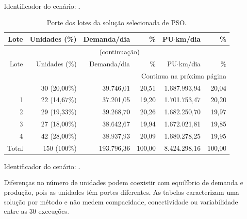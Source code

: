 Identificador do cenário: {\footnotesize{}}.

\begingroup\small
\setlength{\tabcolsep}{5pt}
\begin{longtable}{rrrrrr}
\caption{Porte dos lotes da solução selecionada de PSO.}\label{tab:lotes-pso}\\
\toprule
Lote & Unidades (\%) & Demanda/dia & \% & PU$\cdot$km/dia & \% \\
\midrule
\endfirsthead
\multicolumn{6}{c}{\tablename~\thetable{} (continuação)}\\
\toprule
Lote & Unidades (\%) & Demanda/dia & \% & PU$\cdot$km/dia & \% \\
\midrule
\endhead
\midrule\multicolumn{6}{r}{Continua na próxima página}\\
\endfoot
\bottomrule
\endlastfoot
0 & 30 (20,00\%) & 39.746,01 & 20,51 & 1.687.993,94 & 20,04 \\
1 & 22 (14,67\%) & 37.201,05 & 19,20 & 1.701.753,47 & 20,20 \\
2 & 29 (19,33\%) & 39.268,70 & 20,26 & 1.682.250,70 & 19,97 \\
3 & 27 (18,00\%) & 38.642,67 & 19,94 & 1.672.021,81 & 19,85 \\
4 & 42 (28,00\%) & 38.937,93 & 20,09 & 1.680.278,25 & 19,95 \\
Total & 150 (100\%) & 193.796,36 & 100,00 & 8.424.298,16 & 100,00 \\
\end{longtable}
\endgroup

Identificador do cenário: {\footnotesize{}}.

Diferenças no número de unidades podem coexistir com equilíbrio de demanda e produção, pois as unidades têm portes diferentes. As tabelas caracterizam uma solução por método e não medem compacidade, conectividade ou variabilidade entre as 30 execuções.
